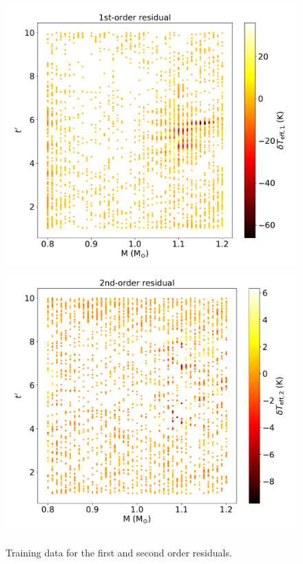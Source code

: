 \begin{figure}
	\includegraphics[width=1.0\columnwidth]{M1_data.pdf}
	\includegraphics[width=1.0\columnwidth]{M2_data.pdf}
    \caption{Training data for the first and second order residuals.}  
    \label{fig:residualsl}
\end{figure}

